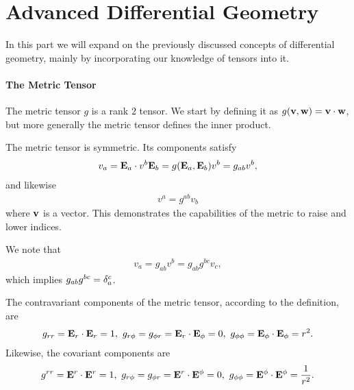 \section{Advanced Differential Geometry}

In this part we will expand on the previously discussed concepts of differential geometry, mainly by incorporating our knowledge of tensors into it.

\paragraph{The Metric Tensor}
The metric tensor $g$ is a rank $2$ tensor. We start by defining it as $g(\vb{v}, \vb{w}) = \vb{v}\cdot\vb{w}$, but more generally the metric tensor defines the inner product.

The metric tensor is symmetric. Its components satisfy
\begin{align*}
	v_{a} = \vb{E}_{a}\cdot v^{b}\vb{E}_{b} = g(\vb{E}_{a}, \vb{E}_{b})v^{b} = g_{ab}v^{b},
\end{align*}
and likewise
\begin{align*}
	v^{a} = g^{ab}v_{b}
\end{align*}
where $\vb{v}$ is a vector. This demonstrates the capabilities of the metric to raise and lower indices.

We note that
\begin{align*}
	v_{a} = g_{ab}v^{b} = g_{ab}g^{bc}v_{c},
\end{align*}
which implies $g_{ab}g^{bc} = \kdelta{a}{c}$.

The contravariant components of the metric tensor, according to the definition, are
\begin{align*}
	g_{rr} = \vb{E}_{r}\cdot\vb{E}_{r} = 1,\ g_{r\phi} = g_{\phi r} = \vb{E}_{r}\cdot\vb{E}_{\phi} = 0,\ g_{\phi\phi} = \vb{E}_{\phi}\cdot\vb{E}_{\phi} = r^{2}.
\end{align*}
Likewise, the covariant components are
\begin{align*}
	g^{rr} = \vb{E}^{r}\cdot\vb{E}^{r} = 1,\ g_{r\phi} = g_{\phi r} = \vb{E}^{r}\cdot\vb{E}^{\phi} = 0,\ g_{\phi\phi} = \vb{E}^{\phi}\cdot\vb{E}^{\phi} = \frac{1}{r^{2}}.
\end{align*}

